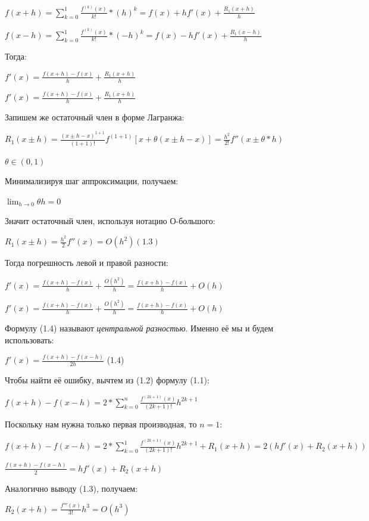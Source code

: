 \documentclass[12pt]{extarticle}
\begin{document}
	\centerline{$f(x+h) = \displaystyle \sum_{k=0}^{1} \frac{f^{(k)}(x)}{k!}*(h)^k = f(x) + hf'(x) + \frac{R_1(x+h)}{h}$}
 	\centerline{$f(x-h) = \displaystyle \sum_{k=0}^{1} \frac{f^{(k)}(x)}{k!}*(-h)^k = f(x) - hf'(x) + \frac{R_1(x-h)}{h}$}
	
	Тогда:
	
	\centerline{$f'(x) = \frac{f(x+h) - f(x)}{h} + \frac{R_1(x+h)}{h} $} 
	\centerline{$f'(x) = \frac{f(x+h) - f(x)}{h} + \frac{R_1(x+h)}{h} $}
	
	Запишем же остаточный член в форме Лагранжа:
	
	\centerline{$R_1(x \pm h) = \frac{(x \pm h - x) ^ {1+1}}{(1+1)!} f^{(1+1)}[x+ \theta(x \pm h - x)] = \frac{h ^2}{2!} f''(x \pm \theta* h)$}
	\centerline{$\theta \in (0,1)$}
	
	Минимализируя шаг аппроксимации, получаем:
	
	\centerline{$\displaystyle \lim_{h \rightarrow 0} \theta h = 0$}
	
	Значит остаточный член, используя нотацию О-большого:
	
	\centerline{$R_1(x \pm h) = \frac{h ^2}{2} f''(x) = O(h^2) (1.3)$}
	
	Тогда погрешность левой и правой разности:
	
	\centerline{$f'(x) = \frac{f(x+h) - f(x)}{h} + \frac{O(h^2)}{h} = \frac{f(x+h) - f(x)}{h} + O(h)$} 
	\centerline{$f'(x) = \frac{f(x+h) - f(x)}{h} + \frac{O(h^2)}{h} =\frac{f(x+h) - f(x)}{h} +O(h)  $}
	
	\newpage
	Формулу (1.4) называют \textit{центральной разностью}. Именно её мы и будем использовать:
	
	\centerline{$f'(x) = \frac{f(x+h) - f(x-h)}{2h}$ (1.4)} 
	
	Чтобы найти её ошибку, вычтем из (1.2) формулу (1.1):
	
	\centerline{$f(x+h) - f(x-h) = 2*\displaystyle \sum_{k=0}^{n} \frac{f^{(2k+1)}(x)}{(2k+1)!}h^{2k+1}$}
	
	Поскольку нам нужна только первая производная, то $n = 1$:
	
	\centerline{$f(x+h) - f(x-h) = 2*\displaystyle \sum_{k=0}^{1} \frac{f^{(2k+1)}(x)}{(2k+1)!}h^{2k+1} + R_1(x+h) = 2(hf'(x) + R_2(x+h))$}
	
	\centerline{$\frac{f(x+h) - f(x-h)}{2} = hf'(x) + R_2(x+h)$}
	
	Аналогично выводу (1.3), получаем: \newline
	\centerline{$R_2(x+h) = \frac{f'''(x)}{3!}h^3 = O(h^3)$}
	
\end{document}
